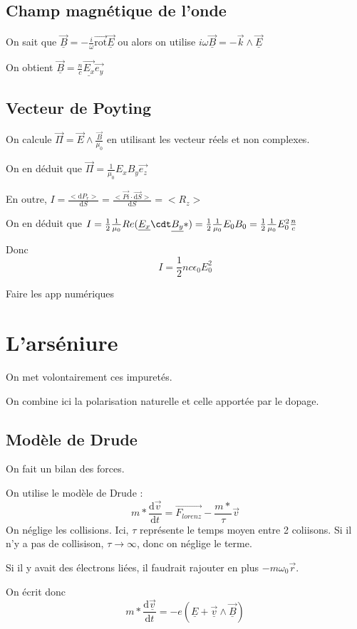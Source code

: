 \documentclass[french]{yLectureNote}
\renewcommand{\vec}{\overrightarrow}
\newcommand{\dd}{\mathrm{d}}
\newcommand{\rot}{\vec{\mathrm{rot}}}
\begin{document}
\subsection{Champ magnétique de l'onde}
On sait que $\underline{\vec{B}} = -\frac{i}{\omega}\rot \underline{\vec{E}}$ ou alors on utilise
$i\omega \underline{\vec{B}} = -\vec{k}\wedge \underline{\vec{E}}$

On obtient $\underline{\vec{B}} = \frac{n}{c}\underline{\vec{E_x}}\vec{e_y}$
\subsection{Vecteur de Poyting}
On calcule $\vec{\Pi} = \vec{E}\wedge \frac{\vec{B}}{\mu_0}$ en utilisant les vecteur réels et non complexes.

On en déduit que $\vec{\Pi} = \frac{1}{\mu_0}E_xB_y\vec{e_z}$

En outre, $I = \frac{<\dd P_r>}{\dd S} = \frac{<\vec{Pi}\cdot \vec{\dd S}>}{\dd S} = <R_z>$

On en déduit que $I = \frac12 \frac{1}{\mu_0} Re(\underline{E_x}\cdt \underline{B_y}*) = \frac12 \frac{1}{\mu_0}E_0B_0 = \frac12 \frac{1}{\mu_0}E_0^2\frac{n}{c}$

Donc 
$$I = \frac{1}{2}nc\epsilon_0E_0^2$$

Faire les app numériques

\section{L'arséniure}
On met volontairement ces impuretés.

On combine ici la polarisation naturelle et celle apportée par le dopage.

\subsection{Modèle de Drude}
On fait un bilan des forces.

On utilise le modèle de Drude : 
$$m* \frac{\dd \vec{v}}{\dd t} = \vec{F_{lorenz}}-\frac{m*}{\tau}\vec{v}$$
On néglige les collisions. Ici, $\tau$ représente le temps moyen entre 2 coliisons. Si il n'y a pas de collisison, $\tau\to \infty$, donc on néglige le terme.

Si il y avait des électrons liées, il faudrait rajouter en plus $-m\omega_0\vec{r}$.

On écrit donc 
$$m*\frac{\dd \underline{\vec{v}}}{\dd t } = -e(\underline{E}+\underline{\vec{v}}\wedge \underline{\vec{B}})$$
\end{document}
